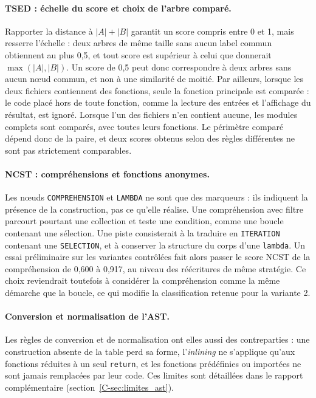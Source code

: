 \documentclass[12pt,a4paper,oneside]{report}
\begin{document}
\paragraph{TSED : échelle du score et choix de l'arbre comparé.}
Rapporter la distance à $|A| + |B|$ garantit un score compris entre 0 et 1,
mais resserre l'échelle : deux arbres de même taille sans aucun label commun
obtiennent au plus 0,5, et tout score est supérieur à celui que donnerait
$\max(|A|,|B|)$. Un score de 0,5 peut donc correspondre à deux arbres sans
aucun nœud commun, et non à une similarité de moitié. Par ailleurs, lorsque les deux fichiers contiennent des fonctions,
seule la fonction principale est comparée : le code placé hors de toute
fonction, comme la lecture des entrées et l'affichage du résultat, est
ignoré. Lorsque l'un des fichiers n'en contient aucune, les modules complets
sont comparés, avec toutes leurs fonctions. Le périmètre comparé dépend donc
de la paire, et deux scores obtenus selon des règles différentes ne sont pas
strictement comparables.

\paragraph{NCST : compréhensions et fonctions anonymes.}
Les nœuds \texttt{COMPREHENSION} et \texttt{LAMBDA} ne sont que des
marqueurs : ils indiquent la présence de la construction, pas ce qu'elle
réalise. Une compréhension avec filtre parcourt pourtant une collection et
teste une condition, comme une boucle contenant une sélection. Une piste
consisterait à la traduire en \texttt{ITERATION} contenant une
\texttt{SELECTION}, et à conserver la structure du corps d'une
\texttt{lambda}. Un essai préliminaire sur les variantes contrôlées fait
alors passer le score NCST de la compréhension de 0,600 à 0,917, au niveau
des réécritures de même stratégie. Ce choix reviendrait toutefois à
considérer la compréhension comme la même démarche que la boucle, ce qui
modifie la classification retenue pour la variante 2.


\paragraph{Conversion et normalisation de l'AST.}
Les règles de conversion et de normalisation ont elles aussi des
contreparties : une construction absente de la table perd sa forme, l'\emph{inlining}
ne s'applique qu'aux fonctions réduites à un seul \texttt{return}, et les
fonctions prédéfinies ou importées ne sont jamais remplacées par leur code.
Ces limites sont détaillées dans le rapport complémentaire
(section~\ref{C-sec:limites_ast}).
\end{document}
